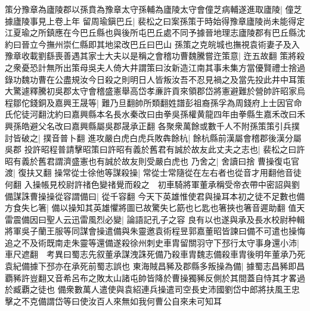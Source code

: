 策分豫章為廬陵郡以孫賁為豫章太守孫輔為廬陵太守會僮芝病輔遂進取廬陵|{
	僮芝據廬陵事見上卷上年}
留周瑜鎭巴丘|{
	裴松之曰案孫策于時始得豫章廬陵尚未能得定江夏瑜之所鎮應在今巴丘縣也與後所屯巴丘處不同予據晉地理志廬陵郡有巴丘縣沈約曰晉立今撫州崇仁縣即其地梁改巴丘曰巴山}
孫策之克皖城也撫視袁術妻子及入豫章收載劉繇喪善遇其家士大夫以是稱之會稽功曹魏騰嘗迕策意|{
	迕五故翻}
策將殺之衆憂恐計無所出策母吳夫人倚大井謂策曰汝新造江南其事未集方當優賢禮士捨過錄功魏功曹在公盡規汝今日殺之則明日人皆叛汝吾不忍見禍之及當先投此井中耳策大驚遽釋騰初吳郡太守會稽盛憲舉高岱孝亷許貢來領郡岱將憲避難於營帥許昭家烏程鄒佗錢銅及嘉興王晟等|{
	難乃旦翻帥所類翻姓譜彭祖裔孫孚為周錢府上士因官命氏佗徒河翻沈約曰嘉興縣本名長水秦改曰由拳吳孫權黄龍四年由拳縣生嘉禾改曰禾興孫皓避父名改曰嘉興縣屬吳郡晟承正翻}
各聚衆萬餘或數千人不附孫策策引兵撲討皆破之|{
	撲音普卜翻}
進攻嚴白虎白虎兵敗犇餘杭|{
	餘杭縣前漢屬會稽郡後漢分屬吳郡}
投許昭程普請擊昭策曰許昭有義於舊君有誠於故友此丈夫之志也|{
	裴松之曰許昭有義於舊君謂濟盛憲也有誠於故友則受嚴白虎也}
乃舍之|{
	舍讀曰捨}
曹操復屯官渡|{
	復扶又翻}
操常從士徐他等謀殺操|{
	常從士常隨從在左右者也從音才用翻他音徒何翻}
入操帳見校尉許禇色變禇覺而殺之　初車騎將軍董承稱受帝衣帶中密詔與劉備謀誅曹操操從容謂備曰|{
	從千容翻}
今天下英雄惟使君與操耳本初之徒不足數也備方食失匕箸|{
	備以操知其英雄懼將圖已故驚失匕筯也匕匙也箸挾也箸音遲助翻}
值天雷震備因曰聖人云迅雷風烈必變|{
	論語記孔子之容}
良有以也遂與承及長水校尉种輯將軍吳子蘭王服等同謀會操遣備與朱靈邀袁術程昱郭嘉董昭皆諫曰備不可遣也操悔追之不及術既南走朱靈等還備遂殺徐州刺史車胄留關羽守下邳行太守事身還小沛|{
	車尺遮翻　考異曰蜀志先叙董承謀洩誅死備乃殺車胄魏志備殺車胄後明年董承乃死袁紀備據下邳亦在承死前蜀志誤也}
東海賊昌豨及郡縣多叛操為備|{
	據蜀志昌豨即昌覇豨許豈翻又音希呂布之敗太山諸屯帥皆降於曹操獨豨反側於其間蓋自恃其才畧過於臧覇之徒也}
備衆數萬人遣使與袁紹連兵操遣司空長史沛國劉岱中郎將扶風王忠擊之不克備謂岱等曰使汝百人來無如我何曹公自來未可知耳

